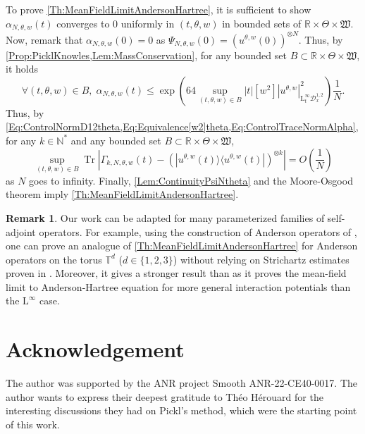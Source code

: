 \documentclass{article}
\def\R{\mathbb R}
\def\N{\mathbb N}
\def\T{\mathbb T}
\def\L{\mathrm L}
\DeclareMathOperator{\Tr}{Tr}
\theoremstyle{definition}
\newtheorem{rem}[theo]{Remark}
\numberwithin{equation}{section}
\begin{document}
To prove \cref{Th:MeanFieldLimitAndersonHartree},
it is sufficient to show $\alpha_{N,\theta,w}(t)$ converges to $0$ uniformly in $(t,\theta,w)$ in bounded sets of $\R\times\Theta\times\mathfrak{W}$. Now, remark that $\alpha_{N,\theta,w}(0)=0$ as $\Psi_{N,\theta,w}(0)=(u^{\theta,w}(0))^{\otimes N}$. Thus, by \cref{Prop:PicklKnowles,Lem:MassConservation}, for any bounded set $B\subset\R\times\Theta\times\mathfrak{W}$, it holds
\begin{equation}
    \forall (t,\theta,w)\in B,\; \alpha_{N,\theta,w}(t) \leqslant \exp\left(64\sup_{(t,\theta,w)\in B}|t|\left[w^2\right]\left|u^{\theta,w}\right|_{\L^\infty_t\mathcal{D}^{1,2}_x}^2\right) \frac{1}{N}.
\end{equation}
Thus, by \cref{Eq:ControlNormD12theta,Eq:Equivalence[w2]theta,Eq:ControlTraceNormAlpha}, for any $k\in\N^*$ and any bounded set $B\subset\R\times\Theta\times\mathfrak{W}$, 
$$\sup_{(t,\theta,w)\in B}\Tr\left|\Gamma_{k,N,\theta,w}(t)-\left(|u^{\theta,w}(t)\rangle\langle u^{\theta,w}(t)|\right)^{\otimes k}\right|=O\left(\frac{1}{N}\right)$$
as $N$ goes to infinity. Finally, \cref{Lem:ContinuityPsiNtheta} and the Moore-Osgood theorem imply \cref{Th:MeanFieldLimitAndersonHartree}.

\begin{rem}

    Our work can be adapted for many parameterized families of self-adjoint operators. For example, using the construction of Anderson operators of \cite{mouzard2023simple}, one can prove an analogue of \cref{Th:MeanFieldLimitAndersonHartree} for Anderson operators on the torus $\T^d$ ($d\in\{1,2,3\}$) without relying on Strichartz estimates proven in \cite{MouzardZachhuberStrichartz,Zachhuber3dAndersonHartreeMeanField}. Moreover, it gives a stronger result than \cite{Zachhuber3dAndersonHartreeMeanField} as it proves the mean-field limit to Anderson-Hartree equation for more general interaction potentials than the $\L^\infty$ case.
    
\end{rem}

\section*{Acknowledgement}

The author was supported by the ANR project Smooth ANR-22-CE40-0017. The author wants to express their deepest gratitude to Théo Hérouard for the interesting discussions they had on Pickl's method, which were the starting point of this work.

\printbibliography
\end{document}
